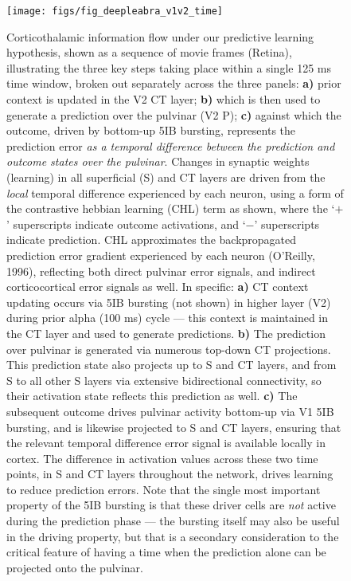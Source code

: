 \documentclass[11pt,twoside]{article}
\newif\myifpdf
\begin{document}
\begin{figure}
  \centering\texttt{[image: figs/fig\_deepleabra\_v1v2\_time]}
  \caption{\footnotesize Corticothalamic information flow under our predictive learning hypothesis, shown as a sequence of movie frames (Retina), illustrating the three key steps taking place within a single 125 ms time window, broken out separately across the three panels: {\bf a)} prior context is updated in the V2 CT layer; {\bf b)} which is then used to generate a prediction over the pulvinar (V2 P); {\bf c)} against which the outcome, driven by bottom-up 5IB bursting, represents the prediction error \emph{as a temporal difference between the prediction and outcome states over the pulvinar}. Changes in synaptic weights (learning) in all superficial (S) and CT layers are driven from the \emph{local} temporal difference experienced by each neuron, using a form of the contrastive hebbian learning (CHL) term as shown, where the `$+$' superscripts indicate outcome activations, and `$-$' superscripts indicate prediction. CHL approximates the backpropagated prediction error gradient experienced by each neuron (O'Reilly, 1996), reflecting both direct pulvinar error signals, and indirect corticocortical error signals as well.  In specific: {\bf a)} CT context updating occurs via 5IB bursting (not shown) in higher layer (V2) during prior alpha (100 ms) cycle --- this context is maintained in the CT layer and used to generate predictions. {\bf b)} The prediction over pulvinar is generated via numerous top-down CT projections. This prediction state also projects up to S and CT layers, and from S to all other S layers via extensive bidirectional connectivity, so their activation state reflects this prediction as well.  {\bf c)} The subsequent outcome drives pulvinar activity bottom-up via V1 5IB bursting, and is likewise projected to S and CT layers, ensuring that the relevant temporal difference error signal is available locally in cortex. The difference in activation values across these two time points, in S and CT layers throughout the network, drives learning to reduce prediction errors.  Note that the single most important property of the 5IB bursting is that these driver cells are \emph{not} active during the prediction phase --- the bursting itself may also be useful in the driving property, but that is a secondary consideration to the critical feature of having a time when the prediction alone can be projected onto the pulvinar.}
  \label{fig.dltime}
\end{figure}
\end{document}
